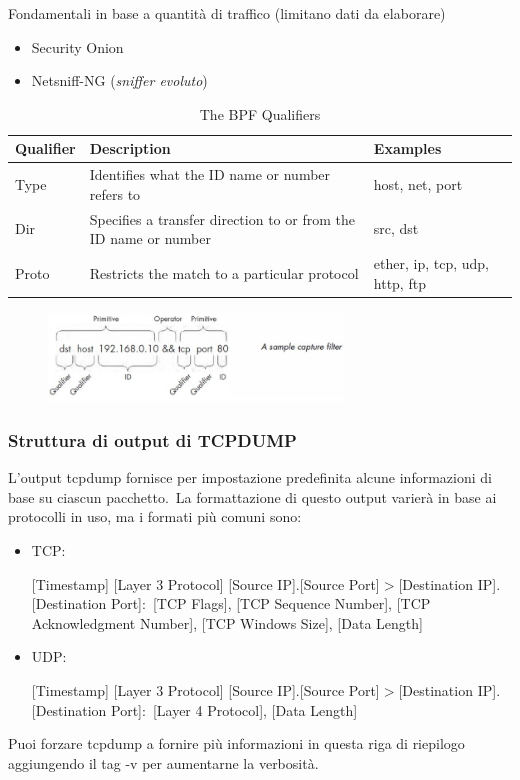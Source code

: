 Fondamentali in base a quantità di traffico (limitano dati da elaborare)
\begin{itemize}
    \item Security Onion
    \item Netsniff-NG (\emph{sniffer evoluto})
\end{itemize}

\begin{table}[H]
    \centering
    \begin{tabular}{|l|m{17em}|m{10em}|}
        \hline
        Qualifier & Description                                                     & Examples                       \\\hline \hline
        Type      & Identifies what the ID name or number refers to                 & host, net, port                \\
        Dir       & Specifies a transfer direction to or from the ID name or number & src, dst                       \\
        Proto     & Restricts the match to a particular protocol                    & ether, ip, tcp, udp, http, ftp \\\hline
    \end{tabular}
    \caption*{The BPF Qualifiers}

\end{table}
\begin{figure}[H]
    \centering
    \includegraphics[width=0.7\textwidth]{immagini/capture_filter_ex.png}
\end{figure}

\subsubsection{Struttura di output di TCPDUMP}

L'output tcpdump fornisce per impostazione predefinita alcune informazioni di base su ciascun pacchetto.\
La formattazione di questo output varierà in base ai protocolli in uso, ma i formati più comuni sono:
\begin{itemize}
    \item TCP:

          [Timestamp] [Layer 3 Protocol] [Source IP].[Source Port]$>$[Destination IP].[Destination Port]:\ [TCP Flags], [TCP Sequence Number], [TCP Acknowledgment Number], [TCP Windows Size], [Data Length]
    \item UDP:

          [Timestamp] [Layer 3 Protocol] [Source IP].[Source Port]$>$[Destination IP].[Destination Port]:\ [Layer 4 Protocol], [Data Length]
\end{itemize}
Puoi forzare tcpdump a fornire più informazioni in questa riga di riepilogo aggiungendo il tag -v per aumentarne la verbosità.

